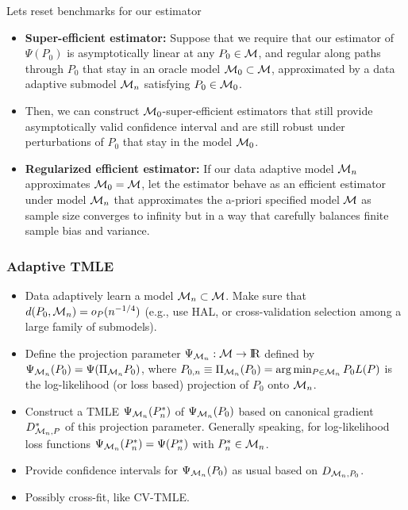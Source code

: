 \documentclass[t]{beamer}
\newlength{\wideitemsep}
\let\olditem\item
\renewcommand{\item}{\setlength{\itemsep}{\wideitemsep}\olditem}
\newcommand{\openr}{\hbox{${\rm I\kern-.2em R}$}}
\begin{document}
\begin{frame}{Lets reset benchmarks for our estimator}
\begin{itemize}
\item {\bf Super-efficient estimator:}
Suppose that we require that our estimator of $\Psi(P_0)$ is asymptotically linear at any $P_0\in {\cal M}$, and regular along paths through $P_0$ that stay in an oracle model ${\cal M}_0\subset {\cal M}$, approximated by a data adaptive submodel ${\cal M}_n$ satisfying $P_0\in {\cal M}_0$.
\item Then, we can construct ${\cal M}_0$-super-efficient estimators that still provide asymptotically valid confidence interval and are still robust under perturbations of $P_0$ that stay in the model ${\cal M}_0$.
\item {\bf Regularized efficient estimator:} If our data adaptive model ${\cal M}_n$ approximates ${\cal M}_0={\cal M}$, let the estimator behave as an efficient estimator under model ${\cal M}_n$ that approximates the a-priori specified model ${\cal M}$ as sample size converges to infinity but in a way that carefully balances finite sample bias and variance.
\end{itemize}
\end{frame}

\begin{frame}
\frametitle{Adaptive TMLE}
\begin{itemize}
\item Data adaptively learn a model ${\cal M}_n\subset {\cal M}$. Make sure that $d(P_0,{\cal M}_n)=o_P(n^{-1/4})$ (e.g., use HAL, or cross-validation selection among a large family of submodels).
\item Define the projection parameter $\Psi_{{\cal M}_n}:{\cal M}\rightarrow\openr$ defined by $\Psi_{{\cal M}_n}(P_0)=\Psi(\Pi_{{\cal M}_n}P_0)$, where $P_{0,n}\equiv \Pi_{{\cal M}_n}(P_0)=\arg\min_{P\in {\cal M}_n}P_0L(P)$ is the log-likelihood (or loss based) projection of $P_0$ onto ${\cal M}_n$.
\item Construct a TMLE $\Psi_{{\cal M}_n}(P_n^*)$ of $\Psi_{{\cal M}_n}(P_0)$ based on canonical gradient $D^*_{{\cal M}_n,P}$ of this projection parameter.
Generally speaking, for log-likelihood loss functions
$\Psi_{{\cal M}_n}(P_n^*)=\Psi(P_n^*)$ with $P_n^*\in{\cal M}_n$.
\item Provide confidence intervals for $\Psi_{{\cal M}_n}(P_0)$ as usual based on $D_{{\cal M}_n,P_0}$.
\item Possibly cross-fit, like CV-TMLE.
\end{itemize}
\end{frame}
\end{document}
